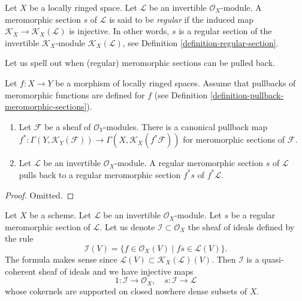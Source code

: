 \begin{definition}
\label{definition-regular-meromorphic-section}
Let $X$ be a locally ringed space.
Let $\mathcal{L}$ be an invertible $\mathcal{O}_X$-module.
A meromorphic section $s$ of $\mathcal{L}$ is said to be {\it regular}
if the induced map
$\mathcal{K}_X \to \mathcal{K}_X(\mathcal{L})$
is injective. In other words, $s$ is a regular
section of the invertible $\mathcal{K}_X$-module
$\mathcal{K}_X(\mathcal{L})$, see
Definition \ref{definition-regular-section}.
\end{definition}

\noindent
Let us spell out when (regular) meromorphic sections can be pulled back.

\begin{lemma}
\label{lemma-meromorphic-sections-pullback}
Let $f : X \to Y$ be a morphism of locally ringed spaces.
Assume that pullbacks of meromorphic functions are defined
for $f$ (see
Definition \ref{definition-pullback-meromorphic-sections}).
\begin{enumerate}
\item Let $\mathcal{F}$ be a sheaf of $\mathcal{O}_Y$-modules.
There is a canonical pullback map
$f^* : \Gamma(Y, \mathcal{K}_Y(\mathcal{F})) \to
\Gamma(X, \mathcal{K}_X(f^*\mathcal{F}))$
for meromorphic sections of $\mathcal{F}$.
\item Let $\mathcal{L}$ be an invertible $\mathcal{O}_X$-module.
A regular meromorphic section $s$ of $\mathcal{L}$ pulls back
to a regular meromorphic section $f^*s$ of $f^*\mathcal{L}$.
\end{enumerate}
\end{lemma}

\begin{proof}
Omitted.
\end{proof}

\begin{lemma}
\label{lemma-regular-meromorphic-ideal-denominators}
Let $X$ be a scheme.
Let $\mathcal{L}$ be an invertible $\mathcal{O}_X$-module.
Let $s$ be a regular meromorphic section of $\mathcal{L}$.
Let us denote $\mathcal{I} \subset \mathcal{O}_X$ the
sheaf of ideals defined by the rule
$$
\mathcal{I}(V)
=
\{f \in \mathcal{O}_X(V) \mid fs \in \mathcal{L}(V)\}.
$$
The formula makes sense since
$\mathcal{L}(V) \subset \mathcal{K}_X(\mathcal{L})(V)$.
Then $\mathcal{I}$ is a quasi-coherent sheaf of ideals and
we have injective maps
$$
1 : \mathcal{I} \longrightarrow \mathcal{O}_X,
\quad
s : \mathcal{I} \longrightarrow \mathcal{L}
$$
whose cokernels are supported on closed nowhere dense subsets of $X$.
\end{lemma}

